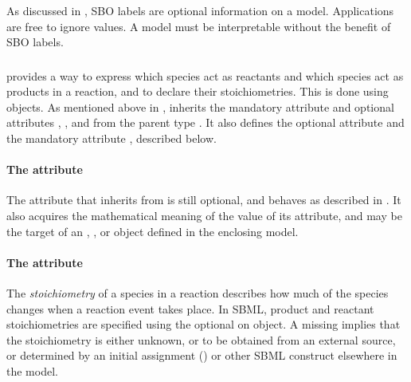As discussed in , SBO labels are optional
information on a model.  Applications are free to ignore
 values.  A model must be interpretable without the
benefit of SBO labels.


\subsubsection{}
\label{subsec:speciesreference}

\Reaction provides a way to express which species act as reactants
and which species act as products in a reaction, and to declare
their stoichiometries.  This is done using \SpeciesReference
objects.  As mentioned above in
, \SpeciesReference
inherits the mandatory attribute  and optional
attributes , , and  from the
parent type \SimpleSpeciesReference.  It also defines the optional
attribute  and the mandatory attribute
, described below.


\begin{blockChanged}
\paragraph{The  attribute}

The  attribute that \SpeciesReference inherits from \SBase is still optional, and behaves as described in .  It also acquires the mathematical meaning of the value of its  attribute, and may be the target of an \InitialAssignment, \EventAssignment, or \Rule object defined in the enclosing model.
\end{blockChanged}

\paragraph{The  attribute}

The {\em stoichiometry} of a species in a reaction describes how
much of the species changes when a reaction event takes place.  In
SBML, product and reactant stoichiometries are specified using the
optional  on \SpeciesReference object.    A missing
 implies that the stoichiometry is either
unknown, or to be obtained from an external source, or determined
by an initial assignment () or
other SBML construct elsewhere in the model.

